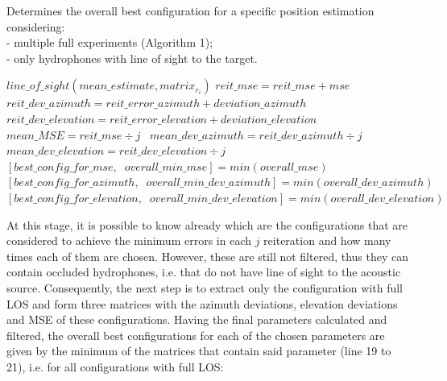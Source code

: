 \begin{algorithm}
	\scriptsize		%
	\caption{Determines the overall best configuration for a specific position estimation considering: \\- multiple full experiments (Algorithm 1); \\ - only hydrophones with line of sight to the target.}
	\label{alg:alg2}
	\begin{algorithmic}[1]
		\STATE {\texttt{**************************}}
		\STATE {\texttt{**************************}}
		\STATE
		\STATE $line\_of\_sight(mean\_estimate, matrix_{r_{i}})$
		\STATE
		\STATE \texttt{$reit\_mse = reit\_mse + mse$ }
		\STATE \texttt{$reit\_dev\_azimuth = reit\_error\_azimuth + deviation\_azimuth$ } 
		\STATE \texttt{$reit\_dev\_elevation = reit\_error\_elevation + deviation\_elevation$} 
		\ENDFOR
		\STATE \texttt{$mean\_MSE = reit\_mse \div j$ }
		\STATE \texttt{$mean\_dev\_azimuth = reit\_dev\_azimuth \div j$ } 
		\STATE \texttt{$mean\_dev\_elevation = reit\_dev\_elevation \div  j$} 
		\STATE
		\STATE
		\STATE $[best\_config\_for\_mse,\; \; overall\_min\_mse] = min(overall\_mse)$
		\STATE $[best\_config\_for\_azimuth,\; \; overall\_min\_dev\_azimuth] = min(overall\_dev\_azimuth)$
		\STATE $[best\_config\_for\_elevation,\; \; overall\_min\_dev\_elevation] = min(overall\_dev\_elevation)$
	\end{algorithmic}
\end{algorithm}

At this stage, it is possible to know already which are the configurations that are considered to achieve the minimum errors in each $j$ reiteration and how many times each of them are chosen. However, these are still not filtered, thus they can contain occluded hydrophones, i.e. that do not have line of sight to the acoustic source. Consequently, the next step is to extract only the configuration with full LOS and form three matrices with the azimuth deviations, elevation deviations and MSE of these configurations. Having the final parameters calculated and filtered, the overall best configurations for each of the chosen parameters are given by the minimum of the matrices that contain said parameter (line 19 to 21), i.e. for all configurations with full LOS:

